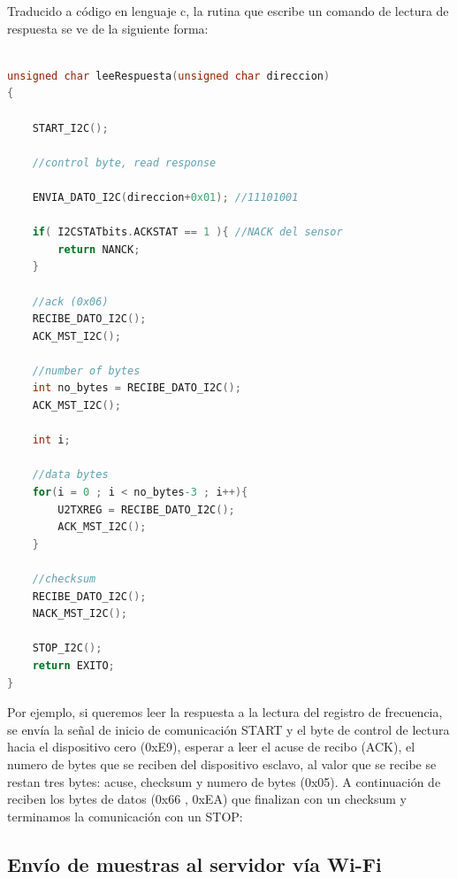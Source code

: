 Traducido a código en lenguaje c, la rutina que escribe un comando de lectura de respuesta se ve de la siguiente forma:

\begin{lstlisting}[language=C]

unsigned char leeRespuesta(unsigned char direccion)
{   
    
    START_I2C();
    
    //control byte, read response
    
    ENVIA_DATO_I2C(direccion+0x01); //11101001   
    
    if( I2CSTATbits.ACKSTAT == 1 ){ //NACK del sensor
        return NANCK;
    }

    //ack (0x06)
    RECIBE_DATO_I2C();
    ACK_MST_I2C();
    
    //number of bytes 
    int no_bytes = RECIBE_DATO_I2C();
    ACK_MST_I2C();
    
    int i;
    
    //data bytes
    for(i = 0 ; i < no_bytes-3 ; i++){
        U2TXREG = RECIBE_DATO_I2C();
        ACK_MST_I2C();
    }
    
    //checksum
    RECIBE_DATO_I2C();
    NACK_MST_I2C();
    
    STOP_I2C();  
    return EXITO;
}

\end{lstlisting}


Por ejemplo, si queremos leer la respuesta a la lectura del registro de frecuencia, se envía la señal de inicio de comunicación START y el byte de control de lectura hacia el dispositivo cero (0xE9), esperar a leer el acuse de recibo (ACK), el numero de bytes que se reciben del dispositivo esclavo, al valor que se recibe se restan tres bytes: acuse, checksum y numero de bytes (0x05). A continuación de reciben los bytes de datos (0x66 , 0xEA) que finalizan con un checksum y terminamos la comunicación con un STOP:

\paragraph{}
\par

\subsection{Envío de muestras al servidor vía Wi-Fi}

